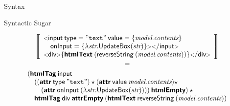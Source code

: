 \documentclass[11.5pt, aspectratio=169]{beamer}
\begin{document}

\begin{frame}{Syntax}
\end{frame}

\begin{frame}{Syntactic Sugar}

    \[
      \left\llbracket
    \begin{array}{l}
      \opentag{input} \: \attribute{type}=\textnode{"text"} \:
      \attribute{value} = \{ \var{model}.\var{contents} \} \\
      \quad
        \attribute{onInput} = \{ \lambda \textit{str}.
          \mkwd{UpdateBox}(\textit{str})\} \closetag \tagzeroend{input}  \\
        \htmltagzero{div}{\antiquote{\htmltext{(\metadef{reverseString} \:
        (\textit{model}. \textit{contents}))}}}
    \end{array}
    \right\rrbracket
  \]
  \[
    =
  \]
  \[
    \begin{array}{l}
        (\textbf{\textsf{htmlTag}} \: \textsf{input} \\
        \quad ((\textbf{\textsf{attr}} \: \mathsf{type} \: \mathtt{"text"}) \star
        (\textbf{\textsf{attr}} \: \mathsf{value} \: \textit{model}.\textit{contents}) \star \\
         \qquad
         (\textbf{\textsf{attr}} \: \mathsf{onInput} \: (\lambda \textit{str}.
         \mathsf{UpdateBox}(\textit{str})))) \: \textbf{\textsf{htmlEmpty}}) \: \star \\
         \quad
         \textbf{\textsf{htmlTag}} \: \textsf{div} \: \textbf{\textsf{attrEmpty}} \: (\textbf{\textsf{htmlText}} \: \mathsf{reverseString} \:
         (\textit{model}.\textit{contents}))
    \end{array}
  \]
\end{frame}
\end{document}
